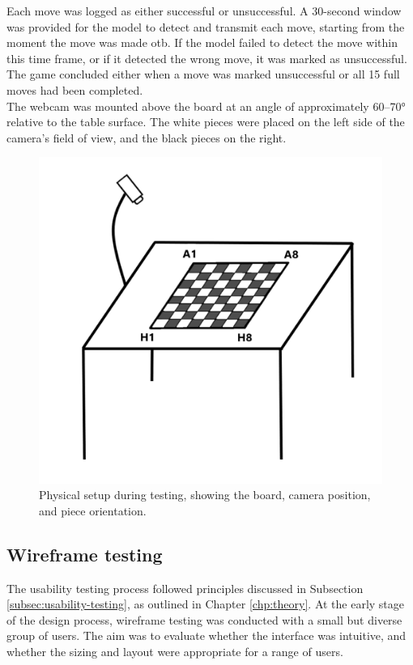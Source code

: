 Each move was logged as either successful or unsuccessful. A 30-second window was provided for the model to detect and transmit each move, starting from the moment the move was made \gls{otb}. If the model failed to detect the move within this time frame, or if it detected the wrong move, it was marked as unsuccessful. The game concluded either when a move was marked unsuccessful or all 15 full moves had been completed. \\

The webcam was mounted above the board at an angle of approximately 60–70\si{\degree}
 relative to the table surface. The white pieces were placed on the left side of the camera's field of view, and the black pieces on the right.

\begin{figure}[h!]
    \centering
    \includegraphics[width=0.75\linewidth]{figures/methods/testing/setup.png}
    \caption[Setup during testing]{Physical setup during testing, showing the board, camera position, and piece orientation.}
    \label{fig:setup}
\end{figure}



\subsection{Wireframe testing}
\label{subsubsec:user-centered-design}

The usability testing process followed principles discussed in Subsection \ref{subsec:usability-testing}, as outlined in Chapter \ref{chp:theory}. At the early stage of the design process, wireframe testing was conducted with a small but diverse group of users. The aim was to evaluate whether the interface was intuitive, and whether the sizing and layout were appropriate for a range of users. \\

